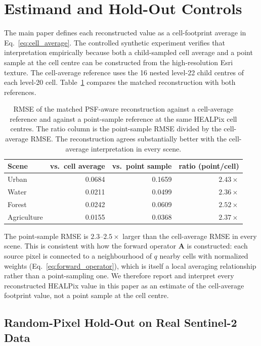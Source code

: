 \documentclass[journal]{IEEEtran}
\newcommand{\healpix}{HEALPix\xspace}
\newcommand{\psf}{PSF\xspace}
\begin{document}
\section{Estimand and Hold-Out Controls}
\label{sec:estimand}

The main paper defines each reconstructed value as a cell-footprint average
in Eq.~\eqref{eq:cell_average}. The controlled synthetic experiment verifies
that interpretation empirically because both a child-sampled cell average and
a point sample at the cell centre can be constructed from the high-resolution
Esri texture. The cell-average reference uses the 16 nested level-22 child
centres of each level-20 cell. Table~\ref{tab:estimand} compares the matched
reconstruction with both references.

\begin{table}[t]
\centering
\caption{RMSE of the matched \psf-aware reconstruction against a
cell-average reference and against a point-sample reference at
the same \healpix cell centres. The ratio column is the
point-sample RMSE divided by the cell-average RMSE. The
reconstruction agrees substantially better with the cell-average
interpretation in every scene.}
\label{tab:estimand}
\begin{tabular}{lrrr}
\toprule
Scene & vs.\ cell average & vs.\ point sample & ratio (point/cell) \\
\midrule
Urban       & 0.0684 & 0.1659 & $2.43\times$ \\
Water       & 0.0211 & 0.0499 & $2.36\times$ \\
Forest      & 0.0242 & 0.0609 & $2.52\times$ \\
Agriculture & 0.0155 & 0.0368 & $2.37\times$ \\
\bottomrule
\end{tabular}
\end{table}

The point-sample RMSE is $2.3$--$2.5\times$ larger than the
cell-average RMSE in every scene. This is consistent with how the
forward operator $\mathbf A$ is constructed: each source pixel is
connected to a neighbourhood of $q$ nearby cells with normalized
weights (Eq.~\eqref{eq:forward_operator}), which is itself a
local averaging relationship rather than a point-sampling one. We
therefore report and interpret every reconstructed \healpix value
in this paper as an estimate of the cell-average footprint value,
not a point sample at the cell centre.

\subsection{Random-Pixel Hold-Out on Real Sentinel-2 Data}
\label{sec:holdout}
\end{document}
